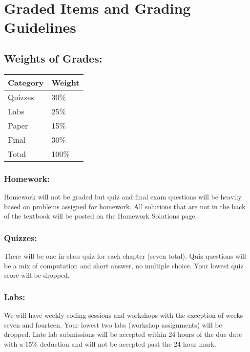 \documentclass[
]{book}
\begin{document}
\hypertarget{graded-items-and-grading-guidelines}{%
\section{Graded Items and Grading Guidelines}\label{graded-items-and-grading-guidelines}}

\hypertarget{weights-of-grades}{%
\subsection{Weights of Grades:}\label{weights-of-grades}}

\begin{tabular}{l|l}
\hline
Category & Weight\\
\hline
Quizzes & 30\%\\
\hline
Labs & 25\%\\
\hline
Paper & 15\%\\
\hline
Final & 30\%\\
\hline
Total & 100\%\\
\hline
\end{tabular}

\hypertarget{homework}{%
\subsubsection{Homework:}\label{homework}}

Homework will not be graded but quiz and final exam questions will be heavily based on problems assigned for homework. All solutions that are not in the back of the textbook will be posted on the Homework Solutions page.

\hypertarget{quizzes}{%
\subsubsection{Quizzes:}\label{quizzes}}

There will be one in-class quiz for each chapter (seven total). Quiz questions will be a mix of computation and short answer, no multiple choice. Your lowest quiz score will be dropped.

\hypertarget{labs}{%
\subsubsection{Labs:}\label{labs}}

We will have weekly coding sessions and workshops with the exception of weeks seven and fourteen. Your lowest two labs (workshop assignments) will be dropped. Late lab submissions will be accepted within 24 hours of the due date with a 15\% deduction and will not be accepted past the 24 hour mark.
\end{document}

